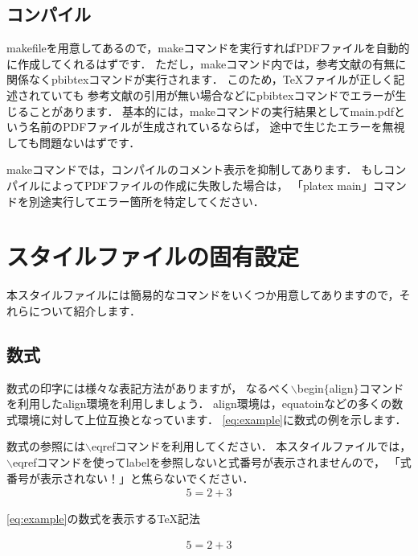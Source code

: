 \subsection{コンパイル}
makefileを用意してあるので，makeコマンドを実行すればPDFファイルを自動的に作成してくれるはずです．
ただし，makeコマンド内では，参考文献の有無に関係なくpbibtexコマンドが実行されます．
このため，TeXファイルが正しく記述されていても
参考文献の引用が無い場合などにpbibtexコマンドでエラーが生じることがあります．
基本的には，makeコマンドの実行結果としてmain.pdfという名前のPDFファイルが生成されているならば，
途中で生じたエラーを無視しても問題ないはずです．

makeコマンドでは，コンパイルのコメント表示を抑制してあります．
もしコンパイルによってPDFファイルの作成に失敗した場合は，
「platex main」コマンドを別途実行してエラー箇所を特定してください．
\section{スタイルファイルの固有設定}
\label{sec:master}
本スタイルファイルには簡易的なコマンドをいくつか用意してありますので，それらについて紹介します．

\subsection{数式}
数式の印字には様々な表記方法がありますが，
なるべく$\backslash$begin$\{$align$\}$コマンドを利用したalign環境を利用しましょう．
align環境は，equatoinなどの多くの数式環境に対して上位互換となっています．
\eqref{eq:example}に数式の例を示します．

数式の参照には$\backslash$eqrefコマンドを利用してください．
本スタイルファイルでは，
$\backslash$eqrefコマンドを使ってlabelを参照しないと式番号が表示されませんので，
「式番号が表示されない！」と焦らないでください．
%
\begin{align}
	5 = 2 + 3
	\label{eq:example}
\end{align}
%
\begin{lstbox}{\eqref{eq:example}の数式を表示するTeX記法}
\begin{minilst}
\begin{align}
	5 = 2 + 3
	\label{eq:1}
\end{align}
\end{minilst}
\end{lstbox}
